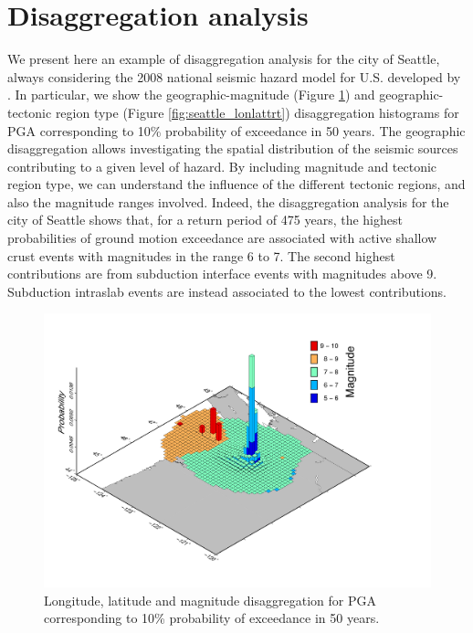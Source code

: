 \section{Disaggregation analysis}
We present here an example of disaggregation analysis for the city of Seattle, always considering the 2008
national seismic hazard model for U.S. developed by \citet{petersen2008}. In particular, we show the geographic-magnitude (Figure \ref{fig:seattle_lonlatmag}) and geographic-tectonic region type (Figure \ref{fig:seattle_lonlattrt}) disaggregation histograms for PGA corresponding to 10\% probability of exceedance in 50 years. The geographic disaggregation allows investigating the spatial distribution of the
seismic sources contributing to a given level of hazard. By including magnitude and tectonic region type,
we can understand the influence of the different tectonic regions, and also the magnitude ranges involved.
Indeed, the disaggregation analysis for the city of Seattle shows that, for a return period of 475 years, the
highest probabilities of ground motion exceedance are associated with active shallow crust events with magnitudes in the range 6 to 7. The second highest contributions are from subduction interface events
with magnitudes above 9. Subduction intraslab events are instead associated to the lowest contributions.
\begin{figure}
\centering
\includegraphics[width=14cm]{./Pictures/Seattle_Lon_Lat_Mag.pdf}
\caption{Longitude, latitude and magnitude disaggregation for PGA corresponding to 10\% probability of exceedance in 50 years.}
\label{fig:seattle_lonlatmag}
\end{figure}

